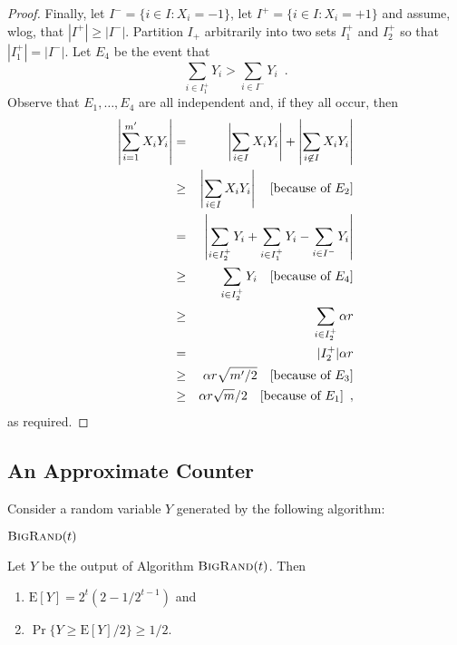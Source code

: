 \documentclass[lotsofwhite]{patmorin}
\newcommand{\bigrand}{\textsc{BigRand}}
\newcommand{\E}{\mathrm{E}}
\newcommand{\note}[1]{\enspace\enspace\hfill{\mbox{[#1]}}}
\begin{document}
\begin{proof}
Finally, let $I^-=\{i\in I:X_i=-1\}$, let $I^+=\{i\in I:X_i=+1\}$ and
assume, wlog, that $|I^+| \ge |I^-|$.  Partition $I_+$ arbitrarily
into two sets $I^+_1$ and $I^+_2$ so that $|I^+_1|=|I^-|$. Let $E_4$ be the event that
\[
     \sum_{i\in I^+_1} Y_i >  \sum_{i\in I^-} Y_i \enspace .
\]
Observe that $E_1,\ldots,E_4$ are all independent and, if they all
occur, then
\begin{eqnarray*}
  \left|\sum_{i=1}^{m'} X_iY_i\right|
   & = & \left|\sum_{i\in I} X_iY_i\right|  
           + \left|\sum_{i\not\in I} X_iY_i\right|  \\
   & \ge & \left|\sum_{i\in I} X_iY_i\right| 
           \note{because of $E_2$}\\
   & = & \left|\sum_{i\in I^+_2} Y_i
       +\sum_{i\in I^+_1} Y_i - \sum_{i\in I^-} Y_i\right| 
           \\
   & \ge & \sum_{i\in I^+_2} Y_i 
           \note{because of $E_4$} \\
   & \ge & \sum_{i\in I^+_2} \alpha r \\
   & = & |I^+_2|\alpha r \\
   & \ge & \alpha r\sqrt{m'/2} 
           \note{because of $E_3$} \\
   & \ge & \alpha r\sqrt{m}/2 
           \note{because of $E_1$} \enspace ,\\
\end{eqnarray*}
as required.
\end{proof}


\subsection{An Approximate Counter}

Consider a random variable $Y$ generated by the following
algorithm:


\noindent
\begin{minipage}{\textwidth}
$\bigrand(t)$
\begin{algorithmic}[1]
  \ELSE
  \ENDIF
\ENDWHILE
{}
\end{algorithmic}
\end{minipage}

\begin{lem}
Let $Y$ be the output of Algorithm $\bigrand(t)$.  Then 
\begin{enumerate}
\item $\E[Y]=2^t(2-1/2^{t-1})$ and
\item $\Pr\{Y \ge \E[Y] / 2\} \ge 1/2$.
\end{enumerate}
\end{lem}
\end{document}
